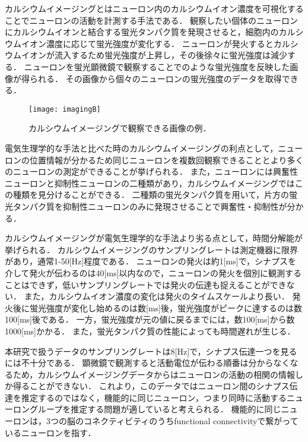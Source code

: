 カルシウムイメージングとはニューロン内のカルシウムイオン濃度を可視化することでニューロンの活動を計測する手法である．
観察したい個体のニューロンにカルシウムイオンと結合する蛍光タンパク質を発現させると，細胞内のカルシウムイオン濃度に応じて蛍光強度が変化する．
ニューロンが発火するとカルシウムイオンが流入するため蛍光強度が上昇し，その後徐々に蛍光強度は減少する．
ニューロンを蛍光顕微鏡で観察することでのような蛍光強度を反映した画像が得られる．
その画像から個々のニューロンの蛍光強度のデータを取得できる．
\begin{figure}[htbp]
	\centering
	\texttt{[image: imagingB]}
	\caption{カルシウムイメージングで観察できる画像の例．}
	\label{fig:imagingB}
\end{figure}

電気生理学的な手法と比べた時のカルシウムイメージングの利点として，ニューロンの位置情報が分かるため同じニューロンを複数回観察できることとより多くのニューロンの測定ができることが挙げられる．
また，ニューロンには興奮性ニューロンと抑制性ニューロンの二種類があり，カルシウムイメージングではこの種類を見分けることができる．
二種類の蛍光タンパク質を用いて，片方の蛍光タンパク質を抑制性ニューロンのみに発現させることで興奮性・抑制性が分かる．

カルシウムイメージングが電気生理学的な手法より劣る点として，時間分解能が挙げられる．
カルシウムイメージングのサンプリングレートは測定機器に限界があり\cite{Nakamura2003}，通常1-50[Hz]程度である．
ニューロンの発火は約1[ms]で，シナプスを介して発火が伝わるのは40[ms]以内\cite{Bi1998}なので，ニューロンの発火を個別に観測することはできず，低いサンプリングレートでは発火の伝達も捉えることができない．
また，カルシウムイオン濃度の変化は発火のタイムスケールより長い．
発火後に蛍光強度が変化し始めるのは数[ms]後，蛍光強度がピークに達するのは数100[ms]後である．
一方，蛍光強度が元の値に戻るまでには，数100[ms]から数1000[ms]かかる\cite{Hira2018}．
また，蛍光タンパク質の性能によっても時間遅れが生じる．

本研究で扱うデータのサンプリングレートは8[Hz]で，シナプス伝達一つを見るには不十分である．
顕微鏡で観測すると活動電位が伝わる順番は分からなくなるため，カルシウムイメージングデータからはニューロンの活動の相関の情報しか得ることができない．
これより，このデータではニューロン間のシナプス伝達を推定するのではなく，機能的に同じニューロン，つまり同時に活動するニューロングループを推定する問題が適していると考えられる．
機能的に同じニューロンは，3つの脳のコネクティビティのうちfunctional connectivityで繋がっているニューロンを指す．
